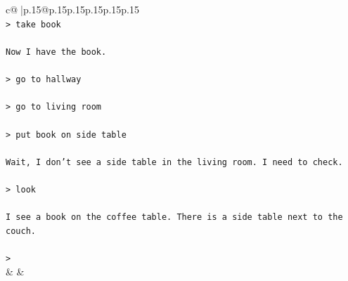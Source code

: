 \documentclass{article}
\begin{document}
{\begin{supertabular}{c@{$\;$}|p{.15\linewidth}@{}p{.15\linewidth}p{.15\linewidth}p{.15\linewidth}p{.15\linewidth}p{.15\linewidth}}
{{{\\ 
\texttt{> take book} \\
\\ 
\texttt{Now I have the book.} \\
\\ 
\texttt{> go to hallway} \\
\\ 
\texttt{> go to living room} \\
\\ 
\texttt{> put book on side table} \\
\\ 
\texttt{Wait, I don't see a side table in the living room. I need to check.} \\
\\ 
\texttt{> look} \\
\\ 
\texttt{I see a book on the coffee table. There is a side table next to the couch.} \\
\\ 
\texttt{>} \\
            }
        }
    }
    & & \\ \\


\end{supertabular}}
\end{document}

